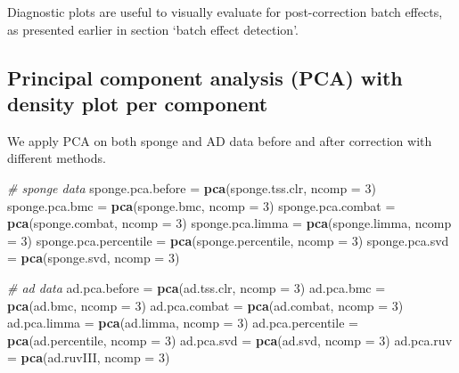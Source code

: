 \documentclass[]{book}
\newenvironment{Shaded}{\begin{snugshade}}{\end{snugshade}}
\newcommand{\KeywordTok}[1]{\textcolor[rgb]{0.13,0.29,0.53}{\textbf{#1}}}
\newcommand{\DataTypeTok}[1]{\textcolor[rgb]{0.13,0.29,0.53}{#1}}
\newcommand{\DecValTok}[1]{\textcolor[rgb]{0.00,0.00,0.81}{#1}}
\newcommand{\StringTok}[1]{\textcolor[rgb]{0.31,0.60,0.02}{#1}}
\newcommand{\CommentTok}[1]{\textcolor[rgb]{0.56,0.35,0.01}{\textit{#1}}}
\newcommand{\NormalTok}[1]{#1}
\begin{document}
Diagnostic plots are useful to visually evaluate for post-correction
batch effects, as presented earlier in section `batch effect detection'.

\subsection{Principal component analysis (PCA) with density plot per
component}\label{principal-component-analysis-pca-with-density-plot-per-component-1}

We apply PCA on both sponge and AD data before and after correction with
different methods.

\begin{Shaded}
\begin{Highlighting}[]
\CommentTok{# sponge data}
\NormalTok{sponge.pca.before =}\StringTok{ }\KeywordTok{pca}\NormalTok{(sponge.tss.clr, }\DataTypeTok{ncomp =} \DecValTok{3}\NormalTok{)}
\NormalTok{sponge.pca.bmc =}\StringTok{ }\KeywordTok{pca}\NormalTok{(sponge.bmc, }\DataTypeTok{ncomp =} \DecValTok{3}\NormalTok{)}
\NormalTok{sponge.pca.combat =}\StringTok{ }\KeywordTok{pca}\NormalTok{(sponge.combat, }\DataTypeTok{ncomp =} \DecValTok{3}\NormalTok{)}
\NormalTok{sponge.pca.limma =}\StringTok{ }\KeywordTok{pca}\NormalTok{(sponge.limma, }\DataTypeTok{ncomp =} \DecValTok{3}\NormalTok{)}
\NormalTok{sponge.pca.percentile =}\StringTok{ }\KeywordTok{pca}\NormalTok{(sponge.percentile, }\DataTypeTok{ncomp =} \DecValTok{3}\NormalTok{)}
\NormalTok{sponge.pca.svd =}\StringTok{ }\KeywordTok{pca}\NormalTok{(sponge.svd, }\DataTypeTok{ncomp =} \DecValTok{3}\NormalTok{)}

\CommentTok{# ad data}
\NormalTok{ad.pca.before =}\StringTok{ }\KeywordTok{pca}\NormalTok{(ad.tss.clr, }\DataTypeTok{ncomp =} \DecValTok{3}\NormalTok{)}
\NormalTok{ad.pca.bmc =}\StringTok{ }\KeywordTok{pca}\NormalTok{(ad.bmc, }\DataTypeTok{ncomp =} \DecValTok{3}\NormalTok{)}
\NormalTok{ad.pca.combat =}\StringTok{ }\KeywordTok{pca}\NormalTok{(ad.combat, }\DataTypeTok{ncomp =} \DecValTok{3}\NormalTok{)}
\NormalTok{ad.pca.limma =}\StringTok{ }\KeywordTok{pca}\NormalTok{(ad.limma, }\DataTypeTok{ncomp =} \DecValTok{3}\NormalTok{)}
\NormalTok{ad.pca.percentile =}\StringTok{ }\KeywordTok{pca}\NormalTok{(ad.percentile, }\DataTypeTok{ncomp =} \DecValTok{3}\NormalTok{)}
\NormalTok{ad.pca.svd =}\StringTok{ }\KeywordTok{pca}\NormalTok{(ad.svd, }\DataTypeTok{ncomp =} \DecValTok{3}\NormalTok{)}
\NormalTok{ad.pca.ruv =}\StringTok{ }\KeywordTok{pca}\NormalTok{(ad.ruvIII, }\DataTypeTok{ncomp =} \DecValTok{3}\NormalTok{)}
\end{Highlighting}
\end{Shaded}
\end{document}
